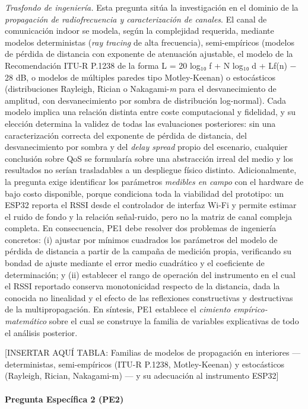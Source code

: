 \documentclass[
  12pt,
]{article}
\begin{document}
\emph{Trasfondo de ingeniería.} Esta pregunta sitúa la investigación en
el dominio de la \emph{propagación de radiofrecuencia y caracterización
de canales}. El canal de comunicación indoor se modela, según la
complejidad requerida, mediante modelos deterministas (\emph{ray
tracing} de alta frecuencia), semi-empíricos (modelos de pérdida de
distancia con exponente de atenuación ajustable, el modelo de la
Recomendación ITU-R P.1238 de la forma L = 20 log₁₀ f + N log₁₀ d +
Lf(n) − 28 dB, o modelos de múltiples paredes tipo Motley-Keenan) o
estocásticos (distribuciones Rayleigh, Rician o Nakagami-\emph{m} para
el desvanecimiento de amplitud, con desvanecimiento por sombra de
distribución log-normal). Cada modelo implica una relación distinta
entre coste computacional y fidelidad, y su elección determina la
validez de todas las evaluaciones posteriores: sin una caracterización
correcta del exponente de pérdida de distancia, del desvanecimiento por
sombra y del \emph{delay spread} propio del escenario, cualquier
conclusión sobre QoS se formularía sobre una abstracción irreal del
medio y los resultados no serían trasladables a un despliegue físico
distinto. Adicionalmente, la pregunta exige identificar los parámetros
\emph{medibles en campo} con el hardware de bajo costo disponible,
porque condiciona toda la viabilidad del prototipo: un ESP32 reporta el
RSSI desde el controlador de interfaz Wi-Fi y permite estimar el ruido
de fondo y la relación señal-ruido, pero no la matriz de canal compleja
completa. En consecuencia, PE1 debe resolver dos problemas de ingeniería
concretos: (i) ajustar por mínimos cuadrados los parámetros del modelo
de pérdida de distancia a partir de la campaña de medición propia,
verificando su bondad de ajuste mediante el error medio cuadrático y el
coeficiente de determinación; y (ii) establecer el rango de operación
del instrumento en el cual el RSSI reportado conserva monotonicidad
respecto de la distancia, dada la conocida no linealidad y el efecto de
las reflexiones constructivas y destructivas de la multipropagación. En
síntesis, PE1 establece el \emph{cimiento empírico-matemático} sobre el
cual se construye la familia de variables explicativas de todo el
análisis posterior.

{[}INSERTAR AQUÍ TABLA: Familias de modelos de propagación en interiores
— deterministas, semi-empíricos (ITU-R P.1238, Motley-Keenan) y
estocásticos (Rayleigh, Rician, Nakagami-m) — y su adecuación al
instrumento ESP32{]}

\paragraph{Pregunta Específica 2
(PE2)}\label{pregunta-especuxedfica-2-pe2}
\end{document}
